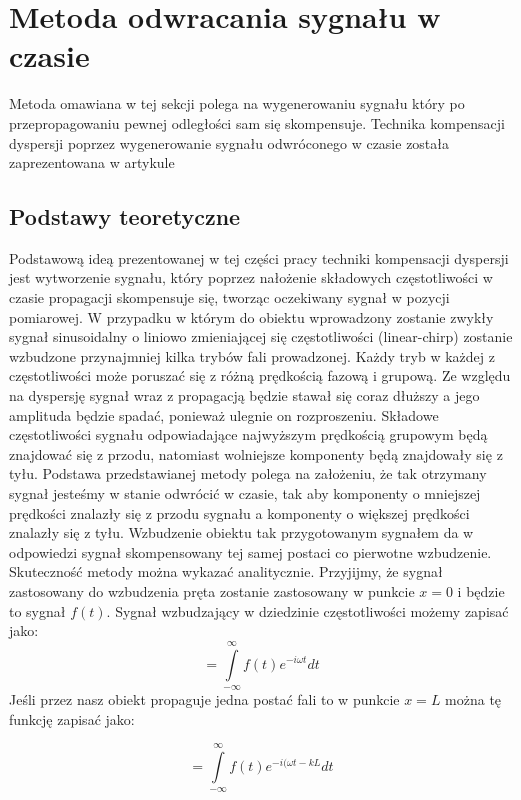 \section{Metoda odwracania sygnału w czasie}
\label{sec:metoda_tr}

Metoda omawiana w tej sekcji polega na wygenerowaniu sygnału który po przepropagowaniu pewnej odległości sam się skompensuje. Technika kompensacji dyspersji poprzez wygenerowanie sygnału odwróconego w czasie została zaprezentowana w artykule \cite{kasia4}

\subsection{Podstawy teoretyczne}
Podstawową ideą prezentowanej w tej części pracy techniki kompensacji dyspersji jest wytworzenie sygnału, który poprzez nałożenie składowych częstotliwości w czasie propagacji skompensuje się, tworząc oczekiwany sygnał w pozycji pomiarowej. W przypadku w którym do obiektu wprowadzony zostanie zwykły sygnał sinusoidalny o liniowo zmieniającej się częstotliwości (linear-chirp) zostanie wzbudzone przynajmniej kilka trybów fali prowadzonej. Każdy tryb w każdej z częstotliwości może poruszać się z różną prędkością fazową i grupową. Ze względu na dyspersję sygnał wraz z propagacją będzie stawał się coraz dłuższy a jego amplituda będzie spadać, ponieważ ulegnie on rozproszeniu.  Składowe częstotliwości sygnału odpowiadające najwyższym prędkością grupowym będą znajdować się z przodu, natomiast wolniejsze komponenty będą znajdowały się z tyłu. Podstawa przedstawianej metody polega na założeniu, że tak otrzymany sygnał jesteśmy w stanie odwrócić w czasie, tak aby komponenty o mniejszej prędkości znalazły się z przodu sygnału a komponenty o większej prędkości znalazły się z tyłu. Wzbudzenie obiektu tak przygotowanym sygnałem da w odpowiedzi sygnał skompensowany tej samej postaci co pierwotne wzbudzenie. Skuteczność metody można wykazać analitycznie. Przyjijmy, że sygnał zastosowany do wzbudzenia pręta zostanie zastosowany w punkcie $x = 0$ i będzie to sygnał $f(t)$. Sygnał wzbudzający w dziedzinie częstotliwości możemy zapisać jako:
\begin{equation}
[F(\omega)_{x=0}]=\int\limits_{-\infty}^{\infty}f(t)e^{-i\omega t}dt \label{eq:F(omega)_x=0}
\end{equation}
Jeśli przez nasz obiekt propaguje jedna postać fali to w punkcie $x=L$ można tę funkcję zapisać jako:

\begin{equation}
[F(\omega)_{x=L}]=\int\limits_{-\infty}^{\infty}f(t)e^{-i(\omega t - kL}dt \label{eq:F(omega)_x=L}
\end{equation}

